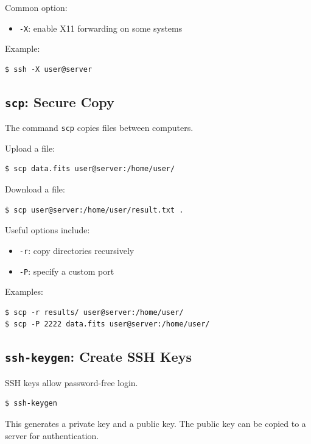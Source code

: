 Common option:

\begin{itemize}
\item \texttt{-X}: enable X11 forwarding on some systems
\end{itemize}

Example:

\begin{lstlisting}
$ ssh -X user@server
\end{lstlisting}

\subsection{\texttt{scp}: Secure Copy}

The command \texttt{scp} copies files between computers.

Upload a file:

\begin{lstlisting}
$ scp data.fits user@server:/home/user/
\end{lstlisting}

Download a file:

\begin{lstlisting}
$ scp user@server:/home/user/result.txt .
\end{lstlisting}

Useful options include:

\begin{itemize}
\item \texttt{-r}: copy directories recursively
\item \texttt{-P}: specify a custom port
\end{itemize}

Examples:

\begin{lstlisting}
$ scp -r results/ user@server:/home/user/
$ scp -P 2222 data.fits user@server:/home/user/
\end{lstlisting}

\subsection{\texttt{ssh-keygen}: Create SSH Keys}

SSH keys allow password-free login.

\begin{lstlisting}
$ ssh-keygen
\end{lstlisting}

This generates a private key and a public key. The public key can be
copied to a server for authentication.

